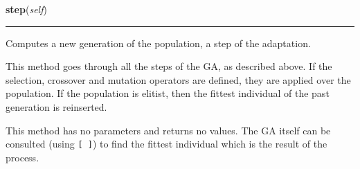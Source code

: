     \label{peach:ga:base:GeneticAlgorithm:step}

    \vspace{0.5ex}

\hspace{.8\funcindent}\begin{boxedminipage}{\funcwidth}

    \raggedright \textbf{step}(\textit{self})

    \vspace{-1.5ex}

    \rule{\textwidth}{0.5\fboxrule}
\setlength{\parskip}{2ex}

Computes a new generation of the population, a step of the adaptation.

This method goes through all the steps of the GA, as described above. If
the selection, crossover and mutation operators are defined, they are
applied over the population. If the population is elitist, then the
fittest individual of the past generation is reinserted.

This method has no parameters and returns no values. The GA itself can
be consulted (using \texttt{{[} {]}}) to find the fittest individual which is the
result of the process.
\setlength{\parskip}{1ex}
    \end{boxedminipage}

    \label{peach:ga:base:GeneticAlgorithm:__call__}

    \vspace{0.5ex}

